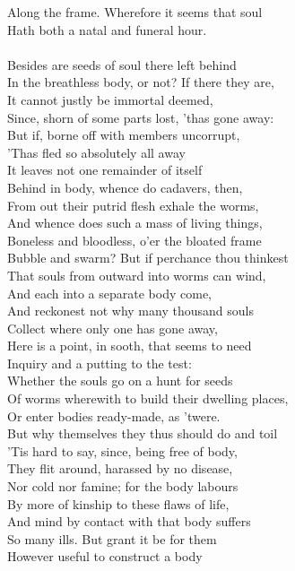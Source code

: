 Along the frame. Wherefore it seems that soul\\
Hath both a natal and funeral hour.\\
\\
Besides are seeds of soul there left behind\\
In the breathless body, or not? If there they are,\\
It cannot justly be immortal deemed,\\
Since, shorn of some parts lost, 'thas gone away:\\
But if, borne off with members uncorrupt,\\
'Thas fled so absolutely all away\\
It leaves not one remainder of itself\\
Behind in body, whence do cadavers, then,\\
From out their putrid flesh exhale the worms,\\
And whence does such a mass of living things,\\
Boneless and bloodless, o'er the bloated frame\\
Bubble and swarm? But if perchance thou thinkest\\
That souls from outward into worms can wind,\\
And each into a separate body come,\\
And reckonest not why many thousand souls\\
Collect where only one has gone away,\\
Here is a point, in sooth, that seems to need\\
Inquiry and a putting to the test:\\
Whether the souls go on a hunt for seeds\\
Of worms wherewith to build their dwelling places,\\
Or enter bodies ready-made, as 'twere.\\
But why themselves they thus should do and toil\\
'Tis hard to say, since, being free of body,\\
They flit around, harassed by no disease,\\
Nor cold nor famine; for the body labours\\
By more of kinship to these flaws of life,\\
And mind by contact with that body suffers\\
So many ills. But grant it be for them\\
However useful to construct a body\\
